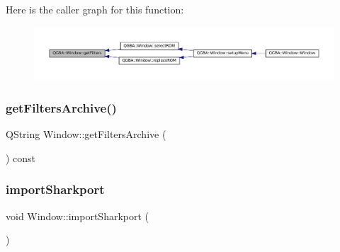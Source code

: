 Here is the caller graph for this function\+:
\nopagebreak
\begin{figure}[H]
\begin{center}
\leavevmode
\includegraphics[width=350pt]{class_q_g_b_a_1_1_window_a6deb2c5ee22e8538d5ca27be1a342a05_icgraph}
\end{center}
\end{figure}
\mbox{\label{class_q_g_b_a_1_1_window_a2b48734321435443a6df97c091700a2e}} 
\subsubsection{\texorpdfstring{get\+Filters\+Archive()}{getFiltersArchive()}}
{\footnotesize\ttfamily Q\+String Window\+::get\+Filters\+Archive (\begin{DoxyParamCaption}{ }\end{DoxyParamCaption}) const\hspace{0.3cm}{\ttfamily [private]}}

\mbox{\label{class_q_g_b_a_1_1_window_a6b323a99433d192ca86d725b8336bfda}} 
\subsubsection{\texorpdfstring{import\+Sharkport}{importSharkport}}
{\footnotesize\ttfamily void Window\+::import\+Sharkport (\begin{DoxyParamCaption}{ }\end{DoxyParamCaption})\hspace{0.3cm}{\ttfamily [slot]}}

